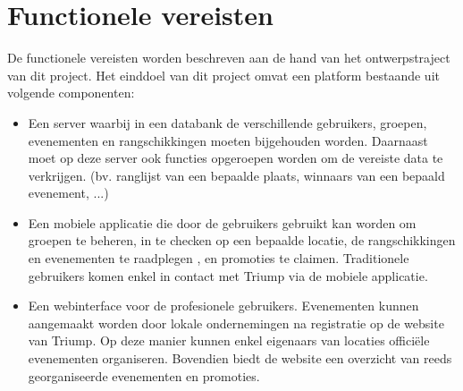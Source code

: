 \section{Functionele vereisten}
De functionele vereisten worden beschreven aan de hand van het ontwerpstraject van dit project.
Het einddoel van dit project omvat een platform bestaande uit volgende componenten: 
\begin{itemize}
	
	\item Een server waarbij in een databank de verschillende gebruikers, groepen, evenementen en rangschikkingen moeten bijgehouden worden. Daarnaast moet op deze server ook functies opgeroepen worden om de vereiste data te verkrijgen. (bv. ranglijst van een bepaalde plaats, winnaars van een bepaald evenement, ...)
	\item Een mobiele applicatie die door de gebruikers gebruikt kan worden om groepen te beheren, in te checken op een bepaalde locatie, de rangschikkingen en evenementen te raadplegen , en promoties te claimen. Traditionele gebruikers komen enkel in contact met Triump via de mobiele applicatie. 
	\item Een webinterface voor de profesionele gebruikers. Evenementen kunnen aangemaakt worden door lokale ondernemingen na registratie op de website van Triump. Op deze manier kunnen enkel eigenaars van locaties officiële evenementen organiseren. Bovendien biedt de website een overzicht van reeds georganiseerde evenementen en promoties.
	
\end{itemize}
